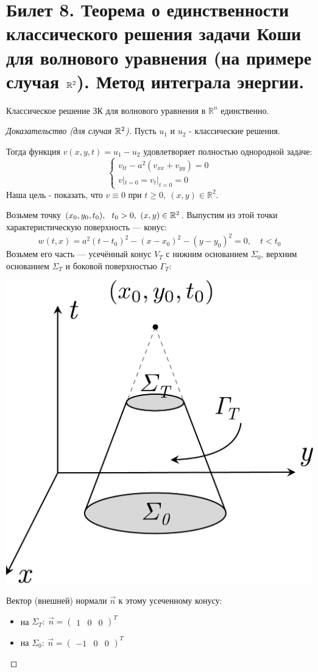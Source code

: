 \documentclass[../main.tex]{subfiles}
\begin{document}
\section{Билет 8. Теорема о единственности классического решения задачи Коши для волнового уравнения (на примере случая \texorpdfstring{$\mathbb{R}^2$}{R\textasciicircum 2}). Метод интеграла энергии.}


\begin{theorem} Классическое решение ЗК для волнового уравнения в $\mathbb{R}^n$ единственно.
\end{theorem}
\begin{proof}[Доказательство (для случая $\mathbb{R}^2$)]
Пусть $u_{1}$ и $u_{2}$ - классические решения.

Тогда функция $v(x,y,t) = u_1 - u_2$ удовлетворяет полностью однородной задаче: 
$$
\begin{cases}
  v_{tt} - a^2(v_{xx} + v_{yy}) = 0\\
  v|_{t=0} = v_t|_{t=0} = 0
\end{cases}
$$
Наша цель - показать, что $v\equiv 0 $ при $ t\geq 0,\ (x,y) \in \mathbb{R}^2$.

Возьмем точку $ (x_0, y_0, t_0),\ \ t_0 > 0,\ (x,y) \in \mathbb{R}^2$. \; Выпустим из этой точки характеристическую поверхность --- конус:
$$ 
w(t,x) = a^2(t - t_0)^2 - (x - x_0)^2 - (y - y_0)^2 = 0,\quad t < t_0
$$
Возьмем его часть --- усечённый конус $ V_T $ с нижним основанием $ \Sigma_0 $, верхним основанием $ \Sigma_T $  и боковой поверхностью $ \Gamma_T:$
\begin{center}
\includegraphics[width=0.28\linewidth]{pic 8.pdf}
\end{center}
Вектор (внешней) нормали $ \vec{n} $ к этому усеченному конусу:
\begin{itemize}
	\item на $\Sigma_T:\ \vec{n} = \begin{pmatrix}1 & 0 & 0\end{pmatrix}^T $
	
	\item на $\Sigma_0:\ \vec{n} = \begin{pmatrix}-1 & 0 & 0\end{pmatrix}^T $
	

\end{itemize}
\end{proof}
\end{document}

